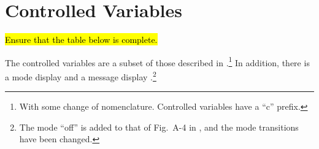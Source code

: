 \documentclass[fontsize=12pt,paper=letter,twoside]{scrartcl}
\begin{document}
\newpage
\section{Controlled Variables}

\hl{Ensure that the table below is complete.}

The controlled variables are a subset of those described in \cite{REMH}.\footnote{With some change of nomenclature. Controlled variables have a ``c'' prefix.} In addition, there is a mode display  and a message display .\footnote{The mode ``off'' is added to that of Fig.~A-4 in \cite{REMH}, and the mode transitions have been changed.}

\end{document}
